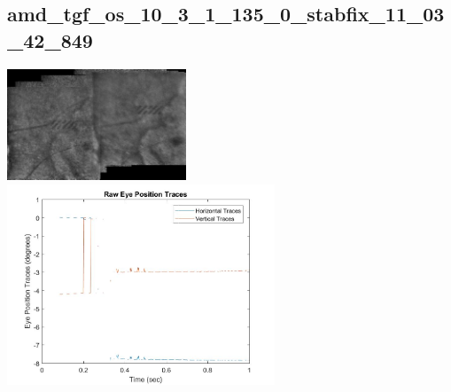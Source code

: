 \documentclass[11pt]{article}
\begin{document}
\subsection{amd\_tgf\_os\_10\_3\_1\_135\_0\_stabfix\_11\_03\_42\_849}
\includegraphics[width=0.40\textwidth, valign=m]{referenceframes/tslo_amd/amd_tgf_os_10_3_1_135_0_stabfix_11_03_42_849_dwt_nostim_gamscaled_bandfilt_refframe.jpg}
\includegraphics[width=0.60\textwidth, valign=m]{eyepositiontraces/tslo_amd/amd_tgf_os_10_3_1_135_0_stabfix_11_03_42_849.jpg}\\
\end{document}
